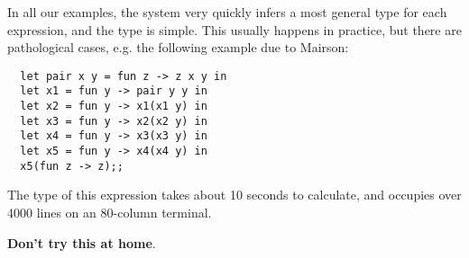 \begin{slide*}


\vspace*{0.5cm}

In all our examples, the system very quickly infers a most general type for
each expression, and the type is simple. This usually happens in practice, but
there are pathological cases, e.g. the following example due to Mairson:

\begin{black}
\begin{verbatim}
  let pair x y = fun z -> z x y in
  let x1 = fun y -> pair y y in
  let x2 = fun y -> x1(x1 y) in
  let x3 = fun y -> x2(x2 y) in
  let x4 = fun y -> x3(x3 y) in
  let x5 = fun y -> x4(x4 y) in
  x5(fun z -> z);;
\end{verbatim}
\end{black}

The type of this expression takes about 10 seconds to calculate, and occupies
over 4000 lines on an 80-column terminal.

{\bf Don't try this at home}.

\end{slide*}




